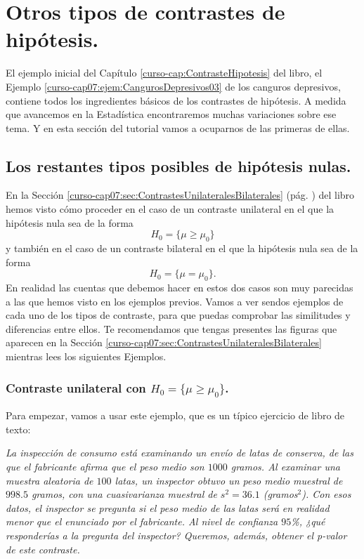 \documentclass[10pt,a4paper]{article}\usepackage[]{graphicx}\usepackage[]{color}
\newcounter {cont01}
\begin{document}
\section{Otros tipos de contrastes de hipótesis.}
\label{tut07:sec:OtrosContrastesHipotesis}

El ejemplo inicial del Capítulo \ref{curso-cap:ContrasteHipotesis} del libro, el Ejemplo \ref{curso-cap07:ejem:CangurosDepresivos03} de los canguros depresivos, contiene todos los ingredientes básicos de los contrastes de hipótesis. A medida que avancemos en la Estadística encontraremos muchas variaciones sobre ese tema. Y en esta sección del tutorial vamos a ocuparnos de las primeras de ellas.

\subsection{Los restantes tipos posibles de hipótesis nulas.}
\label{tut07:subsec:RestantesTiposPosiblesHipotesisNulas}

En la Sección \ref{curso-cap07:sec:ContrastesUnilateralesBilaterales} (pág. \pageref{curso-cap07:sec:ContrastesUnilateralesBilaterales}) del libro hemos visto cómo proceder en el caso de un contraste unilateral en el que la hipótesis nula sea de la forma
    \[H_0=\{\mu\geq \mu_0\}\]
y también en el caso de un contraste bilateral  en el que la hipótesis nula sea de la forma
    \[H_0=\{\mu=\mu_0\}.\]
En realidad las cuentas que debemos hacer en estos dos casos son muy  parecidas a las que hemos visto en los ejemplos previos. Vamos a ver sendos ejemplos de cada uno de los tipos de contraste, para que puedas comprobar las similitudes y diferencias entre ellos. Te recomendamos que tengas presentes las figuras que aparecen en la Sección \ref{curso-cap07:sec:ContrastesUnilateralesBilaterales} mientras lees los siguientes Ejemplos.

\subsubsection{Contraste unilateral con $H_0=\{\mu\geq \mu_0\}$.}

Para empezar, vamos a usar este ejemplo, que es un típico ejercicio de libro de texto:

{\em
La inspección de consumo está examinando un envío de latas de conserva, de las que el fabricante afirma que el peso medio son $1000$ gramos. Al examinar una muestra aleatoria de $100$ latas, un inspector obtuvo un peso medio muestral de $998.5$ gramos, con una cuasivarianza muestral de $s^2 = 36.1$ (gramos$^2$). Con esos datos, el inspector se pregunta si el peso medio de las latas será en realidad  menor que el enunciado por el fabricante. Al nivel de confianza $95$\%, ¿qué responderías a la pregunta del inspector? Queremos, además, obtener el p-valor de este contraste.\\
}
\end{document}
